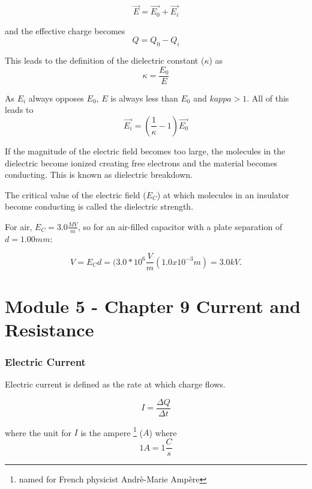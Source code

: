 \documentclass[14pt]{memoir}
\begin{document}
\begin{equation}
\vec{E} = \vec{E_0} + \vec{E_i}
\end{equation}

and the effective charge becomes
\begin{equation}
Q = Q_0 - Q_i
\end{equation}

This leads to the definition of the dielectric constant ($\kappa$) as
\begin{equation}
\kappa = \frac{E_0}{E}
\end{equation}

As $E_i$ always opposes $E_0$, $E$ is always less than $E_0$ and $kappa > 1$. All of this leads to
\begin{equation}
\vec{E_i} = (\frac{1}{\kappa} - 1) \vec{E_0}
\end{equation}

If the magnitude of the electric field becomes too large, the molecules in the dielectric become ionized creating free electrons and the material becomes conducting. This is known as dielectric breakdown. 

The critical value of the electric field ($E_C$) at which molecules in an insulator become conducting is called the dielectric strength. 

For air, $E_C = 3.0 \frac{MV}{m}$, so for an air-filled capacitor with a plate separation of $d = 1.00mm$:

\begin{equation}
V = E_C d = (3.0 * 10^6 \frac{V}{m}(1.0 x 10^{-3}m) = 3.0 kV.
\end{equation}

\chapter{Module 5 - Chapter 9 Current and Resistance}

\subsection{Electric Current}

Electric current is defined as the rate at which charge flows.

\begin{equation}
I = \frac{\Delta Q}{\Delta t}
\end{equation}

where the unit for $I$ is the ampere \footnote{named for French physicist Andr\`e-Marie Amp\`ere} ($A$) where 
\begin{equation}
1 A = 1 \frac{C}{s}
\end{equation}
\end{document}
